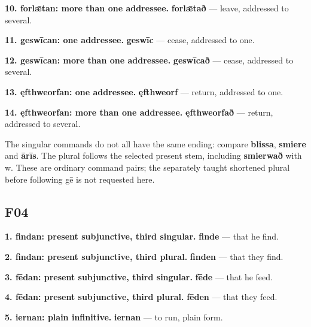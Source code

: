 \textbf{10. forlǣtan: more than one addressee.} \textbf{forlǣtað} — leave, addressed to several.

\textbf{11. geswīcan: one addressee.} \textbf{geswīc} — cease, addressed to one.

\textbf{12. geswīcan: more than one addressee.} \textbf{geswīcað} — cease, addressed to several.

\textbf{13. ęfthweorfan: one addressee.} \textbf{ęfthweorf} — return, addressed to one.

\textbf{14. ęfthweorfan: more than one addressee.} \textbf{ęfthweorfað} — return, addressed to several.

The singular commands do not all have the same ending: compare \textbf{blissa}, \textbf{smiere} and \textbf{ārīs}. The plural follows the selected present stem, including \textbf{smierwað} with w. These are ordinary command pairs; the separately taught shortened plural before following gē is not requested here.

\subsection*{F04}

\textbf{1. findan: present subjunctive, third singular.} \textbf{finde} — that he find.

\textbf{2. findan: present subjunctive, third plural.} \textbf{finden} — that they find.

\textbf{3. fēdan: present subjunctive, third singular.} \textbf{fēde} — that he feed.

\textbf{4. fēdan: present subjunctive, third plural.} \textbf{fēden} — that they feed.

\textbf{5. iernan: plain infinitive.} \textbf{iernan} — to run, plain form.

